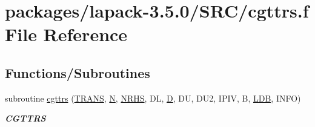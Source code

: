 \hypertarget{cgttrs_8f}{}\section{packages/lapack-\/3.5.0/\+S\+R\+C/cgttrs.f File Reference}
\label{cgttrs_8f}
\subsection*{Functions/\+Subroutines}
\begin{DoxyCompactItemize}
\item 
subroutine \hyperlink{group__complexGTcomputational_gafe8bdadc6f4da5aa5df3fe22dbe6b05b}{cgttrs} (\hyperlink{superlu__enum__consts_8h_a0c4e17b2d5cea33f9991ccc6a6678d62a1f61e3015bfe0f0c2c3fda4c5a0cdf58}{T\+R\+A\+N\+S}, \hyperlink{polmisc_8c_a0240ac851181b84ac374872dc5434ee4}{N}, \hyperlink{example__user_8c_aa0138da002ce2a90360df2f521eb3198}{N\+R\+H\+S}, D\+L, \hyperlink{odrpack_8h_a7dae6ea403d00f3687f24a874e67d139}{D}, D\+U, D\+U2, I\+P\+I\+V, B, \hyperlink{example__user_8c_a50e90a7104df172b5a89a06c47fcca04}{L\+D\+B}, I\+N\+F\+O)
\begin{DoxyCompactList}\small\item\em {\bfseries C\+G\+T\+T\+R\+S} \end{DoxyCompactList}\end{DoxyCompactItemize}
